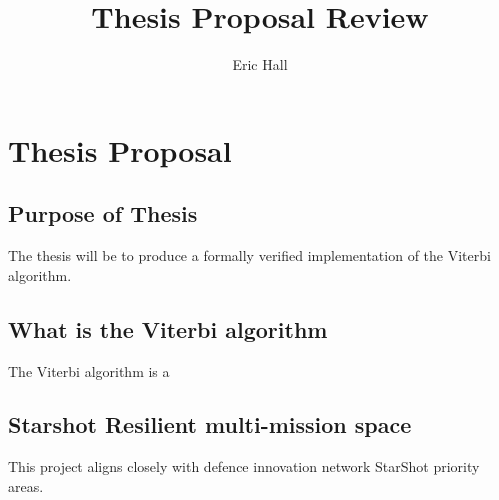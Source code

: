 \documentclass{article}
\title{Thesis Proposal Review}
\author{Eric Hall}
\begin{document}
\maketitle

\section{Thesis Proposal}

\subsection{Purpose of Thesis}

The thesis will be to produce a formally verified implementation of the Viterbi algorithm.



\subsection{What is the Viterbi algorithm}

The Viterbi algorithm is a 

\subsection{Starshot Resilient multi-mission space}

This project aligns closely with defence innovation network StarShot priority areas.
\end{document}
